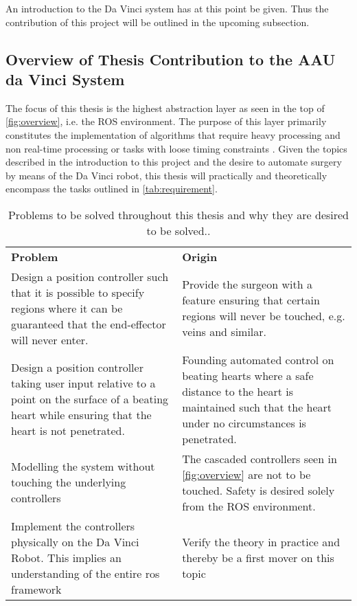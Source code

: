 An introduction to the Da Vinci system has at this point be given. Thus the contribution of this project will be outlined in the upcoming subsection.
\subsection{Overview of Thesis Contribution to the AAU da Vinci System}\label{sec:project_overview}
The focus of this thesis is the highest abstraction layer as seen in the top of \autoref{fig:overview}, i.e. the ROS environment. The purpose of this layer primarily constitutes the implementation of algorithms that require heavy processing and non real-time processing or tasks with loose timing constraints \citep{bib:robot_paper}.
Given the topics described in the introduction to this project and the desire to automate surgery by means of the Da Vinci robot, this thesis will practically and theoretically encompass the tasks outlined in \autoref{tab:requirement}.
\begin{table}[H]
\begin{tabularx}{\textwidth}{X X}
\rowcolor{HeaderBlue} 
\textbf{Problem} &  \textbf{Origin}\\
Design a position controller such that it is possible to specify regions where it can be guaranteed that the end-effector will never enter. & Provide the surgeon with a feature ensuring that certain regions will never be touched, e.g. veins and similar. \\
\rowcolor{textBlue} 
Design a position controller taking  user input relative to a point on the surface of a beating heart while ensuring that the heart is not penetrated. & Founding automated control on beating hearts where a safe distance to the heart is maintained such that the heart under no circumstances is penetrated.\\
Modelling the system without touching the underlying controllers & The cascaded controllers seen in \autoref{fig:overview} are not to be touched. Safety is desired solely from the ROS environment. \\
\rowcolor{textBlue} 
Implement the controllers physically on the Da Vinci Robot. This implies an understanding of the entire \gls{ros} framework & Verify the theory in practice and thereby be a first mover on this topic \\
\end{tabularx}
	\caption{Problems to be solved throughout this thesis and why they are desired to be solved..}
\label{tab:requirement}
\end{table}

